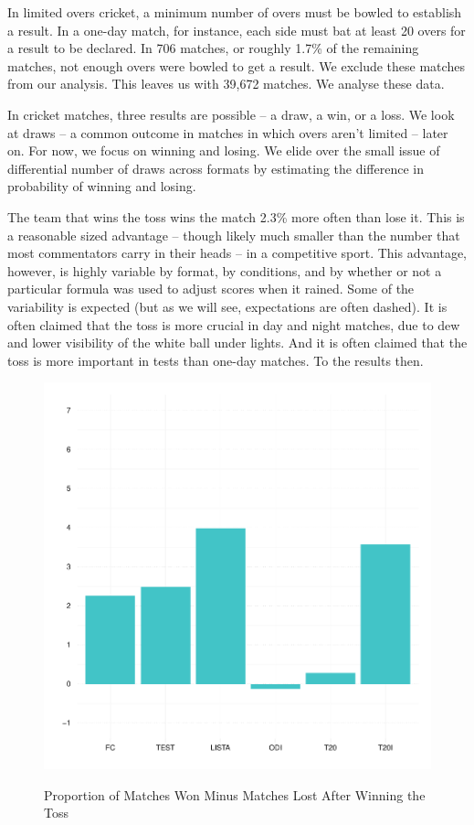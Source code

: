 \documentclass[11pt]{article}
\begin{document}
In limited overs cricket, a minimum number of overs must be bowled to establish a result. In a one-day match, for instance, each side must bat at least 20 overs for a result to be declared. In 706 matches, or roughly 1.7\% of the remaining matches, not enough overs were bowled to get a result. We exclude these matches from our analysis. This leaves us with 39,672 matches. We analyse these data.

In cricket matches, three results are possible -- a draw, a win, or a loss. We look at draws -- a common outcome in matches in which overs aren't limited -- later on. For now, we focus on winning and losing. We elide over the small issue of differential number of draws across formats by estimating the difference in probability of winning and losing. 

The team that wins the toss wins the match 2.3\% more often than lose it. This is a reasonable sized advantage -- though likely much smaller than the number that most commentators carry in their heads -- in a competitive sport. This advantage, however, is highly variable by format, by conditions, and by whether or not a particular formula was used to adjust scores when it rained. Some of the variability is expected (but as we will see, expectations are often dashed). It is often claimed that the toss is more crucial in day and night matches, due to dew and lower visibility of the white ball under lights. And it is often claimed that the toss is more important in tests than one-day matches. To the results then. 


\begin{figure}[htbp]
\centering
\caption{Proportion of Matches Won Minus Matches Lost After Winning the Toss}
\includegraphics[scale=.85]{../figs/winbyType.pdf}
\label{fig:summary}
\end{figure}
\end{document}
